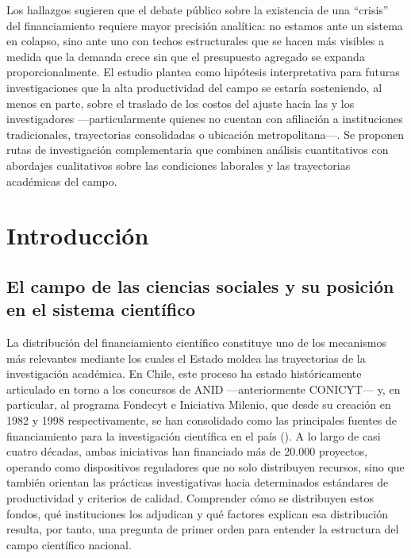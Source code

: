 \documentclass[
  spanish,
  a4paper,
  oneside]{scrbook}
\begin{document}
Los hallazgos sugieren que el debate público sobre la existencia de una
``crisis'' del financiamiento requiere mayor precisión analítica: no
estamos ante un sistema en colapso, sino ante uno con techos
estructurales que se hacen más visibles a medida que la demanda crece
sin que el presupuesto agregado se expanda proporcionalmente. El estudio
plantea como hipótesis interpretativa para futuras investigaciones que
la alta productividad del campo se estaría sosteniendo, al menos en
parte, sobre el traslado de los costos del ajuste hacia las y los
investigadores ---particularmente quienes no cuentan con afiliación a
instituciones tradicionales, trayectorias consolidadas o ubicación
metropolitana---. Se proponen rutas de investigación complementaria que
combinen análisis cuantitativos con abordajes cualitativos sobre las
condiciones laborales y las trayectorias académicas del campo.


\chapter{Introducción}\label{introducciuxf3n}

\section{El campo de las ciencias sociales y su posición en el sistema
científico}\label{el-campo-de-las-ciencias-sociales-y-su-posiciuxf3n-en-el-sistema-cientuxedfico}

La distribución del financiamiento científico constituye uno de los
mecanismos más relevantes mediante los cuales el Estado moldea las
trayectorias de la investigación académica. En Chile, este proceso ha
estado históricamente articulado en torno a los concursos de ANID
---anteriormente CONICYT--- y, en particular, al programa Fondecyt e
Iniciativa Milenio, que desde su creación en 1982 y 1998
respectivamente, se han consolidado como las principales fuentes de
financiamiento para la investigación científica en el país
(). A lo
largo de casi cuatro décadas, ambas iniciativas han financiado más de
20.000 proyectos, operando como dispositivos reguladores que no solo
distribuyen recursos, sino que también orientan las prácticas
investigativas hacia determinados estándares de productividad y
criterios de calidad. Comprender cómo se distribuyen estos fondos, qué
instituciones los adjudican y qué factores explican esa distribución
resulta, por tanto, una pregunta de primer orden para entender la
estructura del campo científico nacional.
\end{document}
